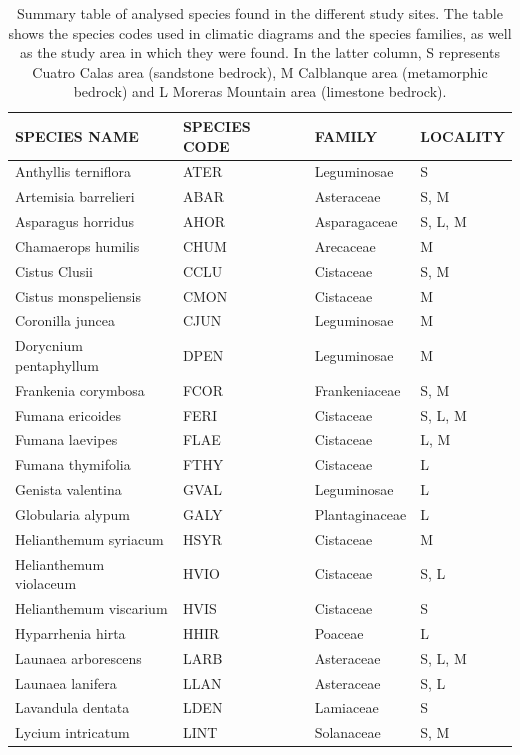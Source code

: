 \documentclass[11pt,twoside]{reedthesis}
\begin{document}
\begin{table}[H]

\caption[Summary table of analysed species]{\label{tab:unnamed-chunk-24}Summary table of analysed species found in the different study sites. The table shows the species codes used in climatic diagrams and the species families, as well as the study area in which they were found. In the latter column, S represents Cuatro Calas area (sandstone bedrock), M Calblanque area (metamorphic bedrock) and L Moreras Mountain area (limestone bedrock).}
\centering
\fontsize{8}{10}\selectfont
\begin{tabular}[t]{llll}
\toprule
SPECIES NAME & SPECIES CODE & FAMILY & LOCALITY\\
\midrule
Anthyllis terniflora & ATER & Leguminosae & S\\
Artemisia barrelieri & ABAR & Asteraceae & S, M\\
Asparagus horridus & AHOR & Asparagaceae & S, L, M\\
Chamaerops humilis & CHUM & Arecaceae & M\\
Cistus Clusii & CCLU & Cistaceae & S, M\\
Cistus monspeliensis & CMON & Cistaceae & M\\
Coronilla juncea & CJUN & Leguminosae & M\\
Dorycnium pentaphyllum & DPEN & Leguminosae & M\\
Frankenia corymbosa & FCOR & Frankeniaceae & S, M\\
Fumana ericoides & FERI & Cistaceae & S, L, M\\
Fumana laevipes & FLAE & Cistaceae & L, M\\
Fumana thymifolia & FTHY & Cistaceae & L\\
Genista valentina & GVAL & Leguminosae & L\\
Globularia alypum & GALY & Plantaginaceae & L\\
Helianthemum syriacum & HSYR & Cistaceae & M\\
Helianthemum violaceum & HVIO & Cistaceae & S, L\\
Helianthemum viscarium & HVIS & Cistaceae & S\\
Hyparrhenia hirta & HHIR & Poaceae & L\\
Launaea arborescens & LARB & Asteraceae & S, L, M\\
Launaea lanifera & LLAN & Asteraceae & S, L\\
Lavandula dentata & LDEN & Lamiaceae & S\\
Lycium intricatum & LINT & Solanaceae & S, M\\

\end{tabular}
\end{table}
\end{document}
